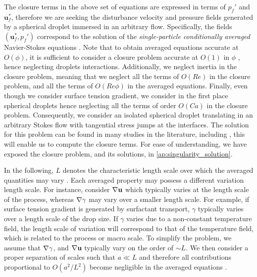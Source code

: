 The closure terms in the above set of equations are expressed in terms of $p_f'$ and $\textbf{u}_f^*$, therefore we are seeking the disturbance velocity and pressure fields generated by a spherical droplet immersed in an arbitrary flow. 
Specifically, the fields $(\textbf{u}_f^*,p_f')$ correspond to the solution of the 
 \textit{single-particle conditionally averaged} Navier-Stokes equations \citep{hinch1977averaged,zhang1994averaged,fintzi2025}. 
Note that to obtain averaged equations accurate at $O(\phi)$, it is sufficient to consider a closure problem accurate at $O(1)$  in $\phi$ \citep{hinch1977averaged,zhang1994averaged}, hence neglecting droplets interactions.
Additionally, we neglect inertia in the closure problem, meaning that we neglect all the terms of $O(Re)$ in the closure problem, and all the terms of $O(Re\phi)$ in the averaged equations. 
Finally, even though we consider surface tension gradient, we consider in the first place spherical droplets hence neglecting all the terms of order $O(Ca)$ in the closure problem. 
Consequently, we consider an isolated spherical droplet translating in an arbitrary Stokes flow with tangential stress jumps at the interfaces.
The solution for this problem can be found in many studies in the literature, including \citet{
    Subramanian_1985,
    nadim1991motion,
    pozrikidis1992boundary,leal2007advanced,raja2010inertial,pozrikidis2011introduction,kim2013microhydrodynamics}, this will enable us to compute the closure terms.
For ease of understanding, we have exposed the closure problem, and its solutions, in \ref{ap:singularity_solution}. 


In the following, $L$ denotes the characteristic length scale over which the averaged quantities may vary \citep{jackson1997locally}. 
Each averaged property may possess a different variation length scale.
For instance, consider $\mathbf{\nabla} \textbf{u}$ which typically varies at the length scale of the process, whereas $\mathbf{\nabla}\gamma$ may vary over a smaller length scale. 
For example, if surface tension gradient is generated by surfactant transport, $\gamma$ typically varies over a length scale of the drop size. 
If $\gamma$ varies due to a non-constant temperature field, the length scale of variation will correspond to that of the temperature field, which is related to the process or macro scale. 
To simplify the problem, we assume that $\mathbf{\nabla}\gamma$, and $\mathbf{\nabla} \textbf{u}$ typically vary on the order of $\sim L$. 
We then consider a proper separation of scales such that $a\ll L$ and therefore all contributions proportional to  $O(a^2/L^2)$ become negligible in the averaged equations \citep{jackson1997locally,zhang1997momentum}. 


